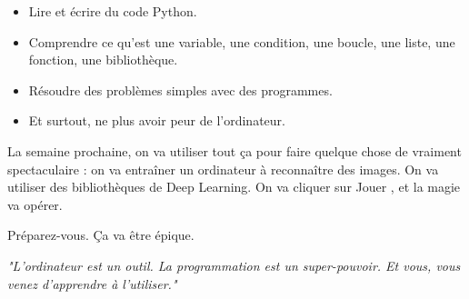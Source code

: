 \documentclass[12pt,a4paper]{article}
\begin{document}
\begin{itemize}
	\item [\ding{172}] Lire et écrire du code Python.
	\item [\ding{173}] Comprendre ce qu'est une variable, une condition, une boucle, une liste, une fonction, une bibliothèque.
	\item [\ding{174}] Résoudre des problèmes simples avec des programmes.
	\item [\ding{175}] Et surtout, ne plus avoir peur de l'ordinateur.
\end{itemize}

La semaine prochaine, on va utiliser tout ça pour faire quelque chose de vraiment spectaculaire : on va entraîner un ordinateur à reconnaître des images. On va utiliser des bibliothèques de Deep Learning. On va cliquer sur \og Jouer \fg, et la magie va opérer.

Préparez-vous. Ça va être épique.

\newpage

\textit{\small "L'ordinateur est un outil. La programmation est un super-pouvoir. Et vous, vous venez d'apprendre à l'utiliser."}
\end{document}
